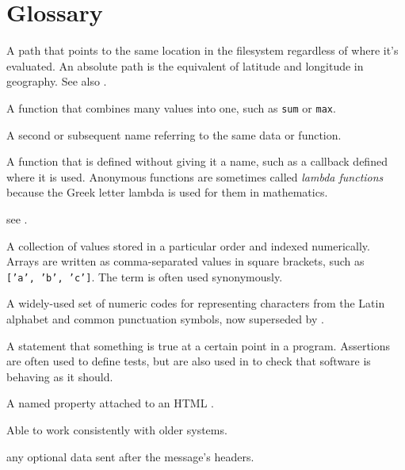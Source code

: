 \chapter{Glossary}\label{s:gloss}

\begin{description}

A path that points to the same location in the filesystem regardless of where
it's evaluated. An absolute path is the equivalent of latitude and longitude
in geography. See also .

A function that combines many values into one, such as \texttt{sum} or \texttt{max}.

A second or subsequent name referring to the same data or function.

A function that is defined without giving it a name, such as a callback
defined where it is used. Anonymous functions are sometimes called \emph{lambda
functions} because the Greek letter lambda is used for them in mathematics.

see .

A collection of values stored in a particular order and indexed numerically.
Arrays are written as comma-separated values in square brackets, such as
\texttt{['a',\ 'b',\ 'c']}. The term  is often used synonymously.

A widely-used set of numeric codes for representing characters from the Latin
alphabet and common punctuation symbols, now superseded by
.

A statement that something is true at a certain point in a program.
Assertions are often used to define tests,
but are also used in  to check that software is behaving as it should.

A named property attached to an HTML .

Able to work consistently with older systems.

any optional data sent after the message's headers.


\end{description}
